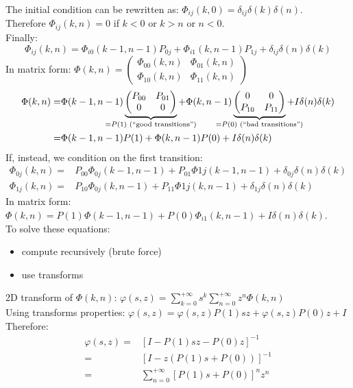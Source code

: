 The initial condition can be rewritten as: $\Phi_{ij}(k,0)=\delta_{ij}\delta(k)\delta(n)$.\\
Therefore $\Phi_{ij}(k,n) = 0$ if $k<0$ or $k>n$ or $n<0$.\\
Finally:
$$\Phi_{ij}(k,n) =  \Phi_{i0}(k-1,n-1)P_{0j} + \Phi_{i1}(k,n-1)P_{1j} + \delta_{ij}\delta(n)\delta(k)$$
In matrix form: $\Phi(k,n) = \begin{pmatrix} \Phi_{00}(k,n)&\Phi_{01}(k,n)\\ \Phi_{10}(k,n)&\Phi_{11}(k,n)\end{pmatrix}$
\begin{equation}
	\begin{split}
			\Phi(k,n) =	 & \Phi(k-1,n-1)\underbrace{\begin{pmatrix} P_{00}&P_{01}\\0&0 \end{pmatrix}}_{\mathclap{= P(1)\text{ (``good transitions'')}}} + \Phi(k,n-1)\underbrace{\begin{pmatrix} 0&0\\ P_{10}&P_{11}\end{pmatrix}}_{\mathclap{=P(0)\text{ (``bad transitions'')}}} + I\delta(n)\delta(k)\\
								= & \Phi(k-1,n-1)P(1) + \Phi(k,n-1)P(0) + I\delta(n)\delta(k)
	\end{split}
\end{equation}
If, instead, we condition on the first transition:
\begin{align*}
\Phi_{0j}(k,n) =& P_{00}\Phi_{0j}(k-1, n-1) + P_{01}\Phi{1j}(k-1,n-1) + \delta_{0j}\delta(n)\delta(k)  \\
\Phi_{1j}(k,n) =& P_{10}\Phi_{0j}(k, n-1) + P_{11}\Phi{1j}(k,n-1) + \delta_{1j}\delta(n)\delta(k)
\end{align*}
In matrix form: $\Phi(k,n) = P(1)\Phi(k-1,n-1) + P(0)\Phi_{i1}(k,n-1) + I\delta(n)\delta(k)$.\\
To solve these equations:
\begin{itemize}
	\item compute recursively (brute force)
	\item use transforms
\end{itemize}
2D transform of $\Phi(k,n)$: $\varphi(s,z) = \sum\limits_{k=0}^{+\infty}s^k\sum\limits_{n=0}^{+\infty}z^n\Phi(k,n)$ \\
Using transforms properties: $\varphi(s,z) = \varphi(s,z)P(1)sz + \varphi(s,z)P(0)z + I $ \\
Therefore:
\begin{equation}
\begin{split}
	\varphi(s,z) = & [I - P(1)sz -P(0)z ]^{-1} \\
							 = & [I - z(P(1)s + P(0))]^{-1} \\
							 = & \sum\limits_{n=0}^{+\infty}[P(1)s + P(0)]^n z^n
\end{split}
\end{equation}

